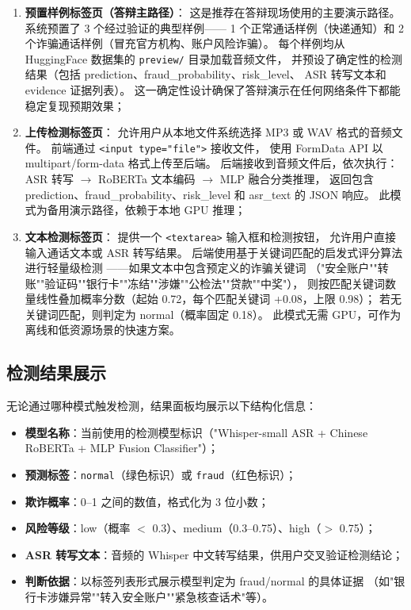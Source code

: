 \documentclass[11pt,a4paper]{ctexart}
\begin{document}
\begin{enumerate}[label=(\arabic*)]
  \item \textbf{预置样例标签页（答辩主路径）}：
  这是推荐在答辩现场使用的主要演示路径。
  系统预置了 3 个经过验证的典型样例——
  1 个正常通话样例（快递通知）和 2 个诈骗通话样例（冒充官方机构、账户风险诈骗）。
  每个样例均从 HuggingFace 数据集的 \texttt{preview/} 目录加载音频文件，
  并预设了确定性的检测结果（包括 prediction、fraud\_probability、risk\_level、
  ASR 转写文本和 evidence 证据列表）。
  这一确定性设计确保了答辩演示在任何网络条件下都能稳定复现预期效果；

  \item \textbf{上传检测标签页}：
  允许用户从本地文件系统选择 MP3 或 WAV 格式的音频文件。
  前端通过 \texttt{<input type="file">} 接收文件，
  使用 FormData API 以 multipart/form-data 格式上传至后端。
  后端接收到音频文件后，依次执行：
  ASR 转写 $\rightarrow$ RoBERTa 文本编码 $\rightarrow$ MLP 融合分类推理，
  返回包含 prediction、fraud\_probability、risk\_level 和 asr\_text 的 JSON 响应。
  此模式为备用演示路径，依赖于本地 GPU 推理；

  \item \textbf{文本检测标签页}：
  提供一个 \texttt{<textarea>} 输入框和检测按钮，
  允许用户直接输入通话文本或 ASR 转写结果。
  后端使用基于关键词匹配的启发式评分算法进行轻量级检测
  ——如果文本中包含预定义的诈骗关键词
  （"安全账户""转账""验证码""银行卡""冻结""涉嫌""公检法""贷款""中奖"），
  则按匹配关键词数量线性叠加概率分数（起始 0.72，每个匹配关键词 +0.08，上限 0.98）；
  若无关键词匹配，则判定为 normal（概率固定 0.18）。
  此模式无需 GPU，可作为离线和低资源场景的快速方案。
\end{enumerate}

\subsection{检测结果展示}

无论通过哪种模式触发检测，结果面板均展示以下结构化信息：
\begin{itemize}
  \item \textbf{模型名称}：当前使用的检测模型标识（"Whisper-small ASR + Chinese RoBERTa + MLP Fusion Classifier"）；
  \item \textbf{预测标签}：\texttt{normal}（绿色标识）或 \texttt{fraud}（红色标识）；
  \item \textbf{欺诈概率}：0--1 之间的数值，格式化为 3 位小数；
  \item \textbf{风险等级}：low（概率 $<$ 0.3）、medium（0.3--0.75）、high（$>$ 0.75）；
  \item \textbf{ASR 转写文本}：音频的 Whisper 中文转写结果，供用户交叉验证检测结论；
  \item \textbf{判断依据}：以标签列表形式展示模型判定为 fraud/normal 的具体证据
  （如"银行卡涉嫌异常""转入安全账户""紧急核查话术"等）。
\end{itemize}
\end{document}
